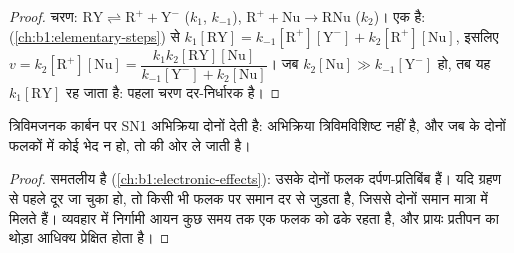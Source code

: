 \begin{proof}
चरण: $\mathrm{RY} \rightleftharpoons \mathrm{R^+} + \mathrm{Y^-}$ ($k_1$,
$k_{-1}$), $\mathrm{R^+} + \mathrm{Nu} \to \mathrm{RNu}$ ($k_2$)।
 एक  है:  (\cref{ch:b1:elementary-steps}) से $k_1[\mathrm{RY}] =
k_{-1}[\mathrm{R^+}][\mathrm{Y^-}] + k_2[\mathrm{R^+}][\mathrm{Nu}]$, इसलिए
$v = k_2[\mathrm{R^+}][\mathrm{Nu}] = \dfrac{k_1k_2[\mathrm{RY}][\mathrm{Nu}]}
{k_{-1}[\mathrm{Y^-}] + k_2[\mathrm{Nu}]}$। जब $k_2[\mathrm{Nu}] \gg
k_{-1}[\mathrm{Y^-}]$ हो, तब यह $k_1[\mathrm{RY}]$ रह जाता है: पहला चरण
दर-निर्धारक है।
\end{proof}

\begin{proposition}[SN1 का त्रिविम रसायन]\label{prop:b1:nucleophilic-substitution:sn1-stereo}
त्रिविमजनक कार्बन पर SN1 अभिक्रिया दोनों  देती है:
अभिक्रिया त्रिविमविशिष्ट नहीं है, और जब  के दोनों फलकों में कोई भेद
न हो, तो  की ओर ले जाती है।
\end{proposition}

\begin{proof}
 समतलीय है (\cref{ch:b1:electronic-effects}): उसके दोनों
फलक दर्पण-प्रतिबिंब हैं। यदि ग्रहण से पहले  दूर जा चुका हो,
तो  किसी भी फलक पर समान दर से जुड़ता है, जिससे
दोनों  समान मात्रा में मिलते हैं। व्यवहार में निर्गामी आयन कुछ समय तक
एक फलक को ढके रहता है, और प्रायः प्रतीपन का थोड़ा आधिक्य
प्रेक्षित होता है।
\end{proof}

